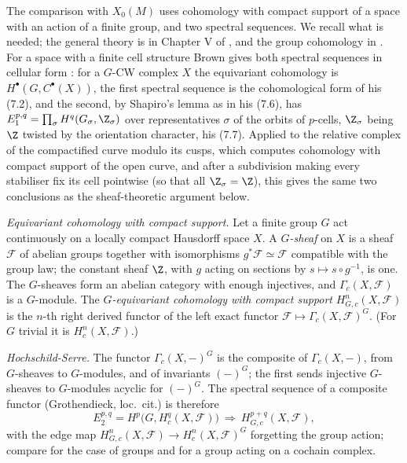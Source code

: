 The comparison with $X_0(M)$ uses cohomology with compact support of a space with an action of a finite group, and two spectral sequences. We recall what is needed; the
general theory is in Chapter V of \cite{Grothendieck57}, and the group cohomology in \cite{Brown}. For a space with a finite cell structure Brown gives both spectral sequences in cellular form \cite[Chapter VII, Section 7]{Brown}: for a $G$-CW complex $X$ the equivariant cohomology is $H^\bullet(G,C^\bullet(X))$, the first spectral sequence is the cohomological form of his (7.2), and the second, by Shapiro's lemma as in his (7.6), has $E_1^{p,q}=\prod_\sigma H^q(G_\sigma,\Z_\sigma)$ over representatives $\sigma$ of the orbits of $p$-cells, $\Z_\sigma$ being $\Z$ twisted by the orientation character, his (7.7). Applied to the relative complex of the compactified curve modulo its cusps, which computes cohomology with compact support of the open curve, and after a subdivision making every stabiliser fix its cell pointwise (so that all $\Z_\sigma=\Z$), this gives the same two conclusions as the sheaf-theoretic argument below.

\emph{Equivariant cohomology with compact support.} Let a finite group $G$ act continuously on a locally compact Hausdorff space $X$. A \emph{$G$-sheaf} on $X$ is a sheaf $\mathcal F$ of abelian groups
together with isomorphisms $g^*\mathcal F\simeq\mathcal F$ compatible with the group law; the constant sheaf $\Z$, with $g$ acting on sections by $s\mapsto s\circ g^{-1}$, is one. The $G$-sheaves form an
abelian category with enough injectives, and $\Gamma_c(X,\mathcal F)$ is a $G$-module. The \emph{$G$-equivariant cohomology with compact support} $H^n_{G,c}(X,\mathcal F)$ is the $n$-th right derived
functor of the left exact functor $\mathcal F\mapsto\Gamma_c(X,\mathcal F)^G$. (For $G$ trivial it is $H^n_c(X,\mathcal F)$.)

\emph{Hochschild-Serre.} The functor $\Gamma_c(X,-)^G$ is the composite of $\Gamma_c(X,-)$, from $G$-sheaves to $G$-modules, and of invariants $(-)^G$; the first sends injective $G$-sheaves to $G$-modules
acyclic for $(-)^G$. The spectral sequence of a composite functor (Grothendieck, loc.\ cit.) is therefore
\[
E_2^{p,q}=H^p\bigl(G,H^q_c(X,\mathcal F)\bigr)\ \Longrightarrow\ H^{p+q}_{G,c}(X,\mathcal F),
\]
with the edge map $H^n_{G,c}(X,\mathcal F)\to H^n_c(X,\mathcal F)^G$ forgetting the group action; compare \cite[Chapter VII, Section 6]{Brown} for the case of groups and \cite[Chapter VII, (5.1) and (7.2)]{Brown} for a group acting on a cochain complex.

